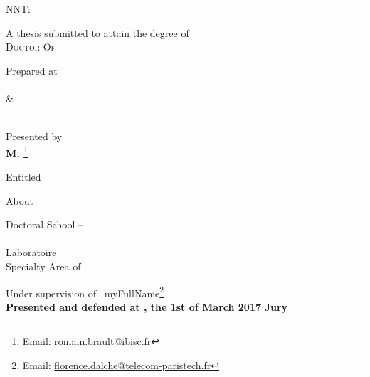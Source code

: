 \begin{titlepage}
\begin{addmargin}[-1cm]{-3cm}
\vspace{2cm}
NNT: \NNT

\vspace{-.5cm}

\begin{center}
\large

\hfill

\begingroup
{A thesis submitted to attain the degree of} \\
{\Huge \color{PSaclay}\textsc{Doctor Of} \\ \textsc{\myUni}}
\endgroup

\vspace{.5cm}
\begingroup
Prepared at \\
{\Huge \color{PSaclay}\textsc{\myUniUEVE}} \\
{\LARGE \&} \\
{\Huge \color{PSaclay}\textsc{\myUniTP}} \\
\endgroup

\vspace{.5cm}
\begingroup
Presented by \\
{\Large\textbf{M. \textsc{\myName}}}\footnote{Email: \href{mailto:romain.brault@ibisc.fr}{romain.brault@ibisc.fr}} %
\endgroup

\bigskip
\vfill

\begingroup
Entitled \\
\smallskip
{\Huge \color{PSaclay}\textsc{\myTitle}} %
\endgroup

\bigskip
\vfill

\begingroup
About \\
{\Large \textbf{\textsc{\mySubtitle}}} %
\endgroup

\bigskip
\vfill

\begingroup
Doctoral School -- \EDN \\
\myDoctoralSchool \\
Laboratoire \myFaculty \\
Specialty Area of \myDepartment
\medskip

\endgroup
\end{center}
\vspace{1cm}
\vfill

\noindent Under supervision of \mySupervisorDegree~myFullName\textsc{\mySupervisor}\footnote{Email: \href{mailto:florence.dalche@telecom-paristech.fr}{florence.dalche@telecom-paristech.fr}} \\
\smallskip
\noindent \textbf{Presented and defended at \myUniUEVE, the 1st of March 2017}
\smallskip
\noindent \textbf{Jury}

\end{addmargin}
\end{titlepage}
